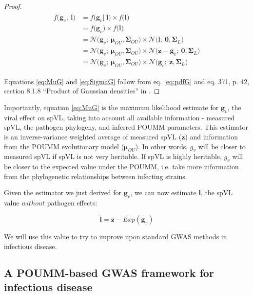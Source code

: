 \documentclass[11pt]{article}
\begin{document}
\begin{linenumbers}
\begin{proof}
	\begin{align}\label{eq:pdfG}
	\begin{split}
		f\big(\bm{g}_v,\ \bm{l}\big) &= f\big(\bm{g}_v|\ \bm{l}\big) \times f\big(\bm{l}\big) \\
	&= f\big(\bm{g}_v\big) \times f\big(\bm{l}\big) \\
	&= \mathcal{N}\big(\bm{g}_v;\ \bm{\mu}_{OU}, \mathbf{\Sigma}_{OU}\big) \times \mathcal{N}\big(\bm{l};\ \bm{0}, \mathbf{\Sigma}_L\big) \\
	&= \mathcal{N}\big(\bm{g}_v;\ \bm{\mu}_{OU}, \mathbf{\Sigma}_{OU}\big) \times \mathcal{N}\big(\bm{z} - \bm{g}_v;\ \bm{0}, \mathbf{\Sigma}_L\big) \\
	&= \mathcal{N}\big(\bm{g}_v;\ \bm{\mu}_{OU}, \mathbf{\Sigma}_{OU}\big) \times \mathcal{N}\big(\bm{g}_v;\ \bm{z}, \mathbf{\Sigma}_L\big)
	\end{split}
\end{align}
	
	Equations \ref{eq:MuG} and \ref{eq:SigmaG} follow from eq. \ref{eq:pdfG} and eq. 371, p. 42, section 8.1.8 ``Product of Gaussian densities'' in \citet{Petersen2012}.
\end{proof}

Importantly, equation \ref{eq:MuG} is the maximum likelihood estimate for $\bm{g}_v$, the viral effect on spVL, taking into account all available information - measured spVL, the pathogen phylogeny, and inferred POUMM parameters. This estimator is an inverse-variance weighted average of measured spVL ($\bm{z}$) and information from the POUMM evolutionary model ($\bm{\mu}_{OU}$). In other words, $g_v$ will be closer to measured spVL if spVL is not very heritable. If spVL is highly heritable, $g_v$ will be closer to the expected value under the POUMM, i.e. take more information from the phylogenetic relationships between infecting strains. 

Given the estimator we just derived for $\bm{g}_v$, we can now estimate $\bm{l}$, the spVL value $without$ pathogen effects: 

\begin{equation}
	\hat{\bm{l}} = \bm{z} - Exp(\bm{g}_v)
	\label{eq:EHat}
\end{equation}

We will use this value to try to improve upon standard GWAS methods in infectious disease.

\subsection*{A POUMM-based GWAS framework for infectious disease}


\end{linenumbers}
\end{document}

